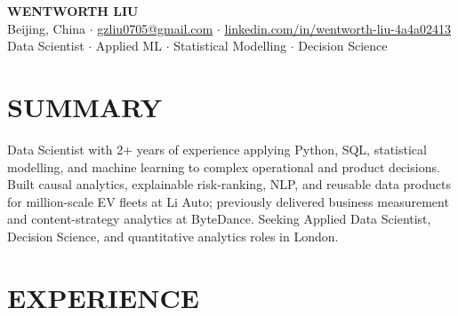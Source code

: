 \documentclass[a4paper,10pt]{article}
\begin{document}
\begin{center}
    {\Large\bfseries WENTWORTH LIU}\\[2pt]
    {\small
    Beijing, China
    \;$\cdot$\;
    \href{mailto:gzliu0705@gmail.com}{gzliu0705@gmail.com}
    \;$\cdot$\;
    \href{https://www.linkedin.com/in/wentworth-liu-4a4a02413/}{linkedin.com/in/wentworth-liu-4a4a02413}
    }\\[2pt]
    {\small Data Scientist \;$\cdot$\; Applied ML \;$\cdot$\; Statistical Modelling \;$\cdot$\; Decision Science}
\end{center}

\vspace{-3pt}

\section{SUMMARY}
Data Scientist with 2+ years of experience applying Python, SQL, statistical modelling, and machine learning to complex operational and product decisions. Built causal analytics, explainable risk-ranking, NLP, and reusable data products for million-scale EV fleets at Li Auto; previously delivered business measurement and content-strategy analytics at ByteDance. Seeking Applied Data Scientist, Decision Science, and quantitative analytics roles in London.

\section{EXPERIENCE}
\end{document}
